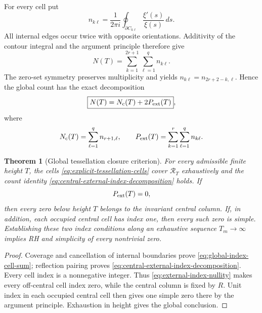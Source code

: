 \documentclass[11pt]{amsart}
\newtheorem{theorem}{Theorem}[section]
\theoremstyle{definition}
\theoremstyle{remark}
\begin{document}
For every cell put
\begin{equation}\label{eq:cell-index-explicit-tessellation}
 n_{k\ell}=\frac{1}{2\pi i}\oint_{\partial C_{k\ell}}
 \frac{\xi'(s)}{\xi(s)}\,ds.
\end{equation}
All internal edges occur twice with opposite orientations.  Additivity of the
contour integral and the argument principle therefore give
\begin{equation}\label{eq:global-index-cell-sum}
 N(T)=\sum_{k=1}^{2r+1}\sum_{\ell=1}^{q}n_{k\ell}.
\end{equation}
The zero-set symmetry preserves multiplicity and yields
$n_{k\ell}=n_{2r+2-k,\ell}$.  Hence the global count has the exact decomposition
\begin{equation}\label{eq:central-external-index-decomposition}
 \boxed{N(T)=N_{\rm c}(T)+2P_{\rm ext}(T)},
\end{equation}
where
\begin{equation}\label{eq:central-external-index-definitions}
 N_{\rm c}(T)=\sum_{\ell=1}^{q}n_{r+1,\ell},
 \qquad
 P_{\rm ext}(T)=\sum_{k=1}^{r}\sum_{\ell=1}^{q}n_{k\ell}.
\end{equation}

\begin{theorem}[Global tessellation closure criterion]
\label{thm:global-tessellation-closure}
For every admissible finite height $T$, the cells
\eqref{eq:explicit-tessellation-cells} cover $\mathcal R_T$ exhaustively and
the count identity \eqref{eq:central-external-index-decomposition} holds.  If
\begin{equation}\label{eq:external-index-nullity}
 P_{\rm ext}(T)=0,
\end{equation}
then every zero below height $T$ belongs to the invariant central column.  If,
in addition, each occupied central cell has index one, then every such zero is
simple.  Establishing these two index conditions along an exhaustive sequence
$T_m\to\infty$ implies RH and simplicity of every nontrivial zero.
\end{theorem}

\begin{proof}
Coverage and cancellation of internal boundaries prove
\eqref{eq:global-index-cell-sum}; reflection pairing proves
\eqref{eq:central-external-index-decomposition}.  Every cell index is a
nonnegative integer.  Thus \eqref{eq:external-index-nullity} makes every
off-central cell index zero, while the central column is fixed by $R$.  Unit
index in each occupied central cell then gives one simple zero there by the
argument principle.  Exhaustion in height gives the global conclusion.
\end{proof}
\end{document}

